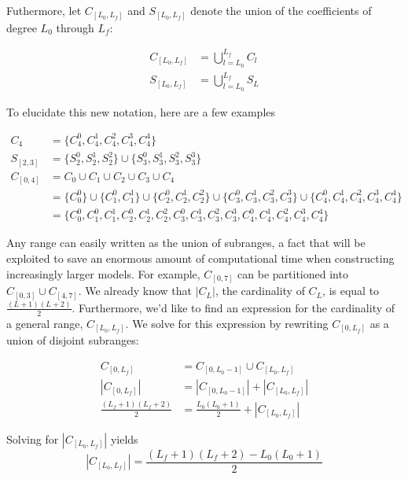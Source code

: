 \documentclass[a4paper]{article}
\theoremstyle{definition}
\begin{document}
Futhermore, let $C_{[L_0, L_f]}$ and $S_{[L_0, L_f]}$ denote the union of the coefficients of degree $L_0$ through $L_f$:

\begin{align*}
    C_{[L_0, L_f]} &= \bigcup_{l = L_0}^{L_f} C_l \\
    S_{[L_0, L_f]} &= \bigcup_{l = L_0}^{L_f} S_L
\end{align*}

To elucidate this new notation, here are a few examples

\begin{align*}
    C_4 &=\{C_4^0, C_4^1, C_4^2, C_4^3, C_4^4\} \\
    S_{[2, 3]} &= \{S_2^0, S_2^1, S_2^2\} \cup \{S_3^0, S_3^1, S_3^2, S_3^3\} \\
    C_{[0, 4]} &= C_0 \cup C_1 \cup C_2 \cup C_3 \cup C_4 \\
               &= \{C_0^0\} \cup \{C_1^0, C_1^1\} \cup \{C_2^0, C_2^1, C_2^2\} \cup \{C_3^0, C_3^1, C_3^2, C_3^3\} \cup \{C_4^0, C_4^1, C_4^2, C_4^3, C_4^4\} \\
               &= \{C_0^0, C_1^0, C_1^1, C_2^0, C_2^1, C_2^2, C_3^0, C_3^1, C_3^2, C_3^3, C_4^0, C_4^1, C_4^2, C_4^3, C_4^4\}
\end{align*}

Any range can easily written as the union of subranges, a fact that will be exploited to save an enormous amount of computational time when constructing
increasingly larger models. For example, $C_{[0, 7]}$ can be partitioned into $C_{[0, 3]} \cup C_{[4, 7]}$. We already know that $|C_L|$, the cardinality of $C_L$, is equal to 
$\frac{(L + 1)(L + 2)}{2}$. Furthermore, we'd like to find an expression for the cardinality of a general range, $C_{[L_0, L_f]}$. We solve for this expression by rewriting $C_{[0, L_f]}$ as 
a union of disjoint subranges:

\begin{align}
    C_{[0, L_f]} &= C_{[0, L_0 - 1]} \cup C_{[L_0, L_f]} \\
    |C_{[0, L_f]}| &= |C_{[0, L_0 - 1]}| + |C_{[L_0, L_f]}| \\
    \frac{(L_f + 1)(L_f + 2)}{2} &= \frac{L_0(L_0 + 1)}{2} + |C_{[L_0, L_f]}|
\end{align}

Solving for $|C_{[L_0, L_f]}|$ yields 
\begin{equation}
    |C_{[L_0, L_f]}| = \frac{(L_f + 1)(L_f + 2) - L_0(L_0 + 1)}{2}
\end{equation}
\end{document}
